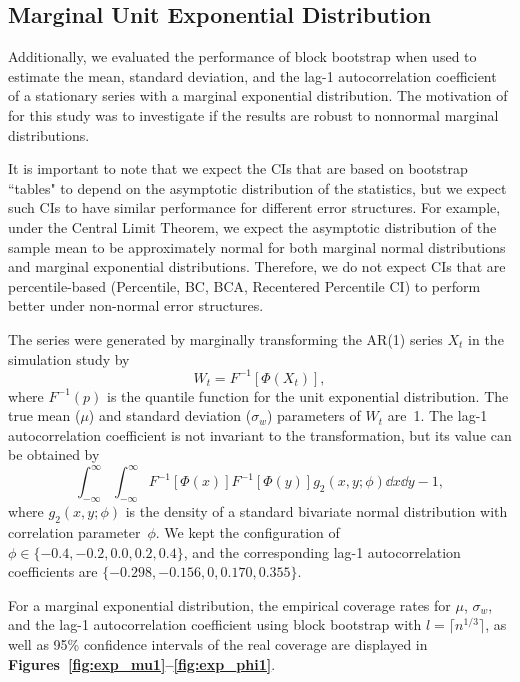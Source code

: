 \documentclass[10pt]{article}
\newcommand{\eds}[1]{\textcolor{red}{EDS: (#1)}}
\newcommand{\mc}[1]{\textcolor{orange}{MC: (#1)}}
\begin{document}
\subsection*{Marginal Unit Exponential Distribution}
Additionally, we evaluated the performance of block bootstrap when used to 
estimate
the mean, standard deviation, and the lag-1 autocorrelation coefficient of a
stationary series with a marginal exponential distribution. The motivation of
for this study was to investigate if the results are robust to nonnormal
marginal distributions.

It is important to note that we expect the CIs that are based on bootstrap 
``tables" to depend on the 
asymptotic distribution of the statistics, but we expect such CIs to 
have similar performance for different error structures. For example, under the 
Central
Limit Theorem, we expect the asymptotic distribution of the sample mean to be 
approximately 
normal for both marginal normal distributions and marginal exponential 
distributions. Therefore, we do not expect CIs that are percentile-based
(Percentile, BC, BCA, Recentered Percentile CI) to perform better under
non-normal error structures.

The series were generated by marginally transforming the
AR(1) series $X_t$ in the simulation study by
\begin{equation*}
W_t = F^{-1}[\Phi(X_t)],
\end{equation*}
where $F^{-1}(p)$ is the quantile function for the unit exponential 
distribution. The true mean ($\mu$) and standard deviation ($\sigma_w$) 
parameters 
of $W_t$ are~1. The 
lag-1
autocorrelation coefficient is not invariant to the
transformation, \citep{hofert2018elements} but its value can be obtained by
\begin{equation*}
\int_{-\infty}^\infty \int_{-\infty}^\infty F^{-1}[\Phi(x)] F^{-1}[\Phi(y)] g_2(x, y; \phi) \dd x \dd y - 1,
\end{equation*}
where $g_2(x, y; \phi)$ is the density of a standard bivariate normal
distribution with correlation parameter~$\phi$. We kept the configuration of
$\phi \in \{-0.4, -0.2, 0.0, 0.2, 0.4\}$, and the corresponding lag-1
autocorrelation coefficients are $\{-0.298, -0.156, \allowbreak 0, 0.170, 0.355\}$.

For a marginal exponential  distribution, the empirical coverage rates for 
$\mu$, $\sigma_w$, %
and 
the lag-1 autocorrelation coefficient using block bootstrap
with $l = \lceil n^{1/3} \rceil$, %
as well as 95\%
confidence intervals of the real coverage are displayed in 
\textbf{Figures~\ref{fig:exp_mu1}--\ref{fig:exp_phi1}}. 
\end{document}
